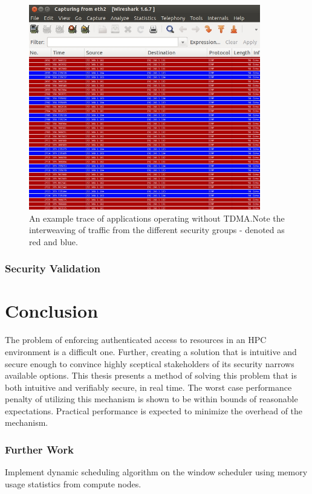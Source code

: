 \documentclass[oneside,12pt]{memoir}
\begin{document}
\begin{figure}
  \begin{center}
    \includegraphics[width=0.9\textwidth]{wireshark_random.jpg}
  \end{center}
  \caption{An example trace of applications operating without TDMA.Note the interweaving of traffic from the different security groups - denoted as red and blue.}
\label{fig:wireshark_random}
\end{figure}

\subsection{Security Validation}
\chapter{Conclusion}
The problem of enforcing authenticated access to resources in an HPC environment is a difficult one. Further, creating a solution that is intuitive and secure enough to convince highly sceptical stakeholders of its security narrows available options. This thesis presents a method of solving this problem that is both intuitive and verifiably secure, in real time. The worst case performance penalty of utilizing this mechanism is shown to be within bounds of reasonable expectations. Practical performance is expected to minimize the overhead of the mechanism. 
\subsection{Further Work}
Implement dynamic scheduling algorithm on the window scheduler using memory usage statistics from compute nodes. 



\end{document}

